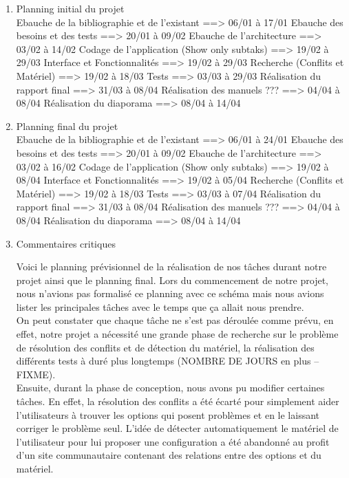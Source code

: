 \documentclass[16pts]{report}
\begin{document}
\begin{enumerate}
	\item Planning initial du projet
	\\
	Ebauche de la bibliographie et de l'existant	==> 06/01 à 17/01
	Ebauche des besoins et des tests				==> 20/01 à 09/02
	Ebauche de l'architecture						==> 03/02 à 14/02
	Codage de l'application	(Show only subtaks)		==> 19/02 à 29/03
		Interface et Fonctionnalités				==> 19/02 à 29/03
		Recherche (Conflits et Matériel)			==> 19/02 à 18/03
		Tests										==> 03/03 à 29/03
	Réalisation du rapport final					==> 31/03 à 08/04
	Réalisation des manuels ???						==> 04/04 à 08/04
	Réalisation du diaporama						==> 08/04 à 14/04


	\item Planning final du projet
	\\
	Ebauche de la bibliographie et de l'existant	==> 06/01 à 24/01
	Ebauche des besoins et des tests				==> 20/01 à 09/02
	Ebauche de l'architecture						==> 03/02 à 16/02
	Codage de l'application	(Show only subtaks)		==> 19/02 à 08/04
		Interface et Fonctionnalités				==> 19/02 à 05/04
		Recherche (Conflits et Matériel)			==> 19/02 à 18/03
		Tests										==> 03/03 à 07/04
	Réalisation du rapport final					==> 31/03 à 08/04
	Réalisation des manuels ???						==> 04/04 à 08/04
	Réalisation du diaporama						==> 08/04 à 14/04
	\\

	\item Commentaires critiques

	Voici le planning prévisionnel de la réalisation de nos tâches durant 
	notre projet ainsi que le planning final. Lors du commencement de notre 
	projet, nous n'avions pas formalisé ce planning avec ce schéma mais nous 
	avions lister les principales tâches avec le temps que ça allait 
	nous prendre.
	\\
	On peut constater que chaque tâche ne s'est pas déroulée comme prévu, 
	en effet, notre projet a nécessité une grande phase de recherche sur le 
	problème de résolution des conflits et de détection du matériel, la 
	réalisation des différents tests à duré plus longtemps 
	(NOMBRE DE JOURS en plus -- FIXME).
	\\
	Ensuite, durant la phase de conception, nous avons pu modifier 
	certaines tâches. En effet, la résolution des conflits a été écarté 
	pour simplement aider l'utilisateurs à trouver les options qui posent 
	problèmes et en le laissant corriger le problème seul. L'idée de détecter 
	automatiquement le matériel de l'utilisateur pour lui proposer une 
	configuration a été abandonné au profit d'un site communautaire 
	contenant des relations entre des options et du matériel.



\end{enumerate}
\end{document}
